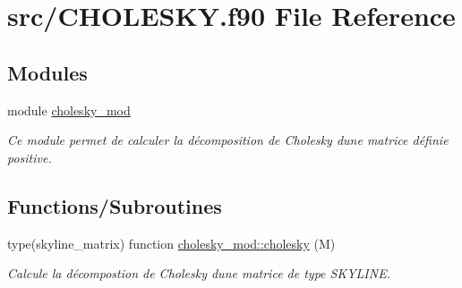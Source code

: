 \hypertarget{_c_h_o_l_e_s_k_y_8f90}{}\section{src/\+C\+H\+O\+L\+E\+S\+KY.f90 File Reference}
\label{_c_h_o_l_e_s_k_y_8f90}
\subsection*{Modules}
\begin{DoxyCompactItemize}
\item 
module \hyperlink{namespacecholesky__mod}{cholesky\+\_\+mod}
\begin{DoxyCompactList}\small\item\em Ce module permet de calculer la décomposition de Cholesky d\textquotesingle{}une matrice définie positive. \end{DoxyCompactList}\end{DoxyCompactItemize}
\subsection*{Functions/\+Subroutines}
\begin{DoxyCompactItemize}
\item 
type(skyline\+\_\+matrix) function \hyperlink{namespacecholesky__mod_a1cbaf08b2c159febf9d4a76d7819a1cd}{cholesky\+\_\+mod\+::cholesky} (M)
\begin{DoxyCompactList}\small\item\em Calcule la décompostion de Cholesky d\textquotesingle{}une matrice de type S\+K\+Y\+L\+I\+NE. \end{DoxyCompactList}\end{DoxyCompactItemize}
